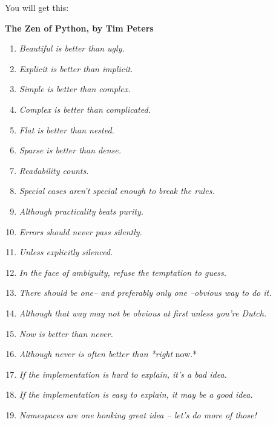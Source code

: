 \documentclass[letterpaper,10pt,english]{manual}
\begin{document}
You will get this:

\textbf{The Zen of Python, by Tim Peters}
\begin{enumerate}
\item {} 
\emph{Beautiful is better than ugly.}

\item {} 
\emph{Explicit is better than implicit.}

\item {} 
\emph{Simple is better than complex.}

\item {} 
\emph{Complex is better than complicated.}

\item {} 
\emph{Flat is better than nested.}

\item {} 
\emph{Sparse is better than dense.}

\item {} 
\emph{Readability counts.}

\item {} 
\emph{Special cases aren't special enough to break the rules.}

\item {} 
\emph{Although practicality beats purity.}

\item {} 
\emph{Errors should never pass silently.}

\item {} 
\emph{Unless explicitly silenced.}

\item {} 
\emph{In the face of ambiguity, refuse the temptation to guess.}

\item {} 
\emph{There should be one-- and preferably only one --obvious way to do it.}

\item {} 
\emph{Although that way may not be obvious at first unless you're Dutch.}

\item {} 
\emph{Now is better than never.}

\item {} 
\emph{Although never is often better than *right} now.*

\item {} 
\emph{If the implementation is hard to explain, it's a bad idea.}

\item {} 
\emph{If the implementation is easy to explain, it may be a good idea.}

\item {} 
\emph{Namespaces are one honking great idea -- let's do more of those!}

\end{enumerate}
\end{document}
